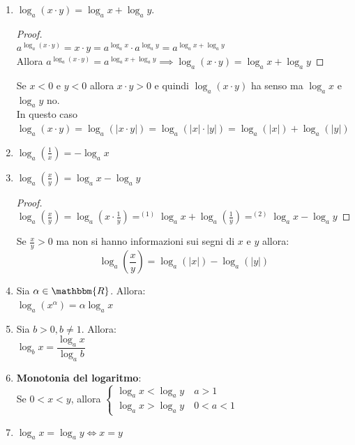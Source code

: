 \documentclass[12pt]{report}
\begin{document}
	\begin{enumerate}
		\item $\log_a{(x \cdot y)} = \log_a{x} + \log_a{y}$. \\
		\begin{proof} \quad \\
			$a^{\log_a{(x \cdot y)}} = x \cdot y = a^{\log_a{x}} \cdot a^{\log_a{y}} = a^{\log_a{x} + \log_a{y}} $ \\
			Allora $a^{\log_a{(x\cdot y)}} = a^{\log_a{x} + \log_a{y}} \implies \log_a{(x \cdot y)} = \log_a{x} + \log_a{y}$
		\end{proof}
		\begin{note}{}{}
			Se $x<0$ e $y<0$ allora $x \cdot y > 0$ e quindi $\log_a{(x \cdot y)}$ ha senso ma $\log_a{x}$ e $\log_a{y}$ no. \\
			In questo caso $\log_a{(x \cdot y)} = \log_a{(|x \cdot y|)} = \log_a{(|x| \cdot |y|)} = \log_a{(|x|)} + \log_a{(|y|)}$
		\end{note}
		\item $\log_a{(\frac{1}{x})} = -\log_a{x}$
		\item $\log_a{(\frac{x}{y})} = \log_a{x} - \log_a{y}$
		\begin{proof} \quad \\
			$\log_a{(\frac{x}{y})} = \log_a{(x \cdot \frac{1}{y})}=^{(1)}\log_a{x} + \log_a{(\frac{1}{y})} =^{(2)}\log_a{x}-\log_a{y}$
		\end{proof}
		\begin{note}{}{}
			Se $\frac{x}{y}>0$ ma non si hanno informazioni sui segni di $x$ e $y$ allora:
			\[
			\log_a{(\frac{x}{y})} = \log_a{(|x|)} - \log_a{(|y|)}
			\]
		\end{note}
		\item Sia $\alpha \in \mathbbm{R}$. Allora: \\
		$\log_a{(x^\alpha)} = \alpha\log_a{x}$
		\item Sia $b > 0, b \neq 1$. Allora: \\
		$\log_b{x} = \dfrac{\log_a{x}}{\log_a{b}}$
		\item \textbf{Monotonia del logaritmo}: \\
		Se $0 < x < y$, allora $\begin{cases}
			\log_a{x} < \log_a{y} \quad a > 1 \\
			\log_a{x} > \log_a{y} \quad 0 < a < 1
		\end{cases}$
		\item $\log_a{x} = \log_a{y} \iff x = y$
	\end{enumerate}
\end{document}
